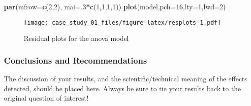 \documentclass[
]{article}
\newenvironment{Shaded}{\begin{snugshade}}{\end{snugshade}}
\newcommand{\AttributeTok}[1]{\textcolor[rgb]{0.13,0.29,0.53}{#1}}
\newcommand{\DecValTok}[1]{\textcolor[rgb]{0.00,0.00,0.81}{#1}}
\newcommand{\FunctionTok}[1]{\textcolor[rgb]{0.13,0.29,0.53}{\textbf{#1}}}
\newcommand{\NormalTok}[1]{#1}
\newcommand{\SpecialCharTok}[1]{\textcolor[rgb]{0.81,0.36,0.00}{\textbf{#1}}}
\begin{document}
\begin{Shaded}
\begin{Highlighting}[]
\FunctionTok{par}\NormalTok{(}\AttributeTok{mfrow=}\FunctionTok{c}\NormalTok{(}\DecValTok{2}\NormalTok{,}\DecValTok{2}\NormalTok{), }\AttributeTok{mai=}\NormalTok{.}\DecValTok{3}\SpecialCharTok{*}\FunctionTok{c}\NormalTok{(}\DecValTok{1}\NormalTok{,}\DecValTok{1}\NormalTok{,}\DecValTok{1}\NormalTok{,}\DecValTok{1}\NormalTok{))}
\FunctionTok{plot}\NormalTok{(model,}\AttributeTok{pch=}\DecValTok{16}\NormalTok{,}\AttributeTok{lty=}\DecValTok{1}\NormalTok{,}\AttributeTok{lwd=}\DecValTok{2}\NormalTok{)}
\end{Highlighting}
\end{Shaded}

\begin{figure}
\centering
\texttt{[image: case\_study\_01\_files/figure-latex/resplots-1.pdf]}
\caption{Residual plots for the anova model}
\end{figure}

\subsubsection{Conclusions and
Recommendations}\label{conclusions-and-recommendations}

The discussion of your results, and the scientific/technical meaning of
the effects detected, should be placed here. Always be sure to tie your
results back to the original question of interest!
\end{document}
